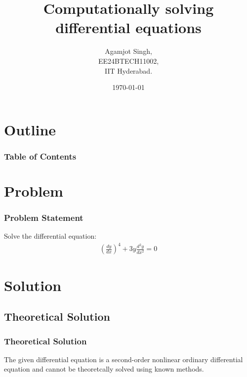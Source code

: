 \documentclass{beamer}
\title{Computationally solving differential equations \brak{\text{9.1.3}}}
\author{Agamjot Singh,\\EE24BTECH11002,\\IIT Hyderabad.}
\date{\today}
\providecommand{\brak}[1]{\ensuremath{\left(#1\right)}}
\theoremstyle{remark}
\numberwithin{equation}{section}
\begin{document}
\begin{frame}
\titlepage
\end{frame}

\section*{Outline}
\begin{frame}
\frametitle{Table of Contents}
\tableofcontents
\end{frame}

\section{Problem}

\begin{frame}
\frametitle{Problem Statement}
Solve the differential equation:
\begin{align}
    \brak{\frac{dy}{dx}}^4 + 3y{\frac{d^2 y}{d x^2}} = 0
\end{align}
\end{frame}

\section{Solution}

\subsection{Theoretical Solution}
\begin{frame}
\frametitle{Theoretical Solution}
The given differential equation is a second-order nonlinear ordinary differential equation and cannot be theoretcally solved using known methods.
\newline
\end{frame}

\end{document}
